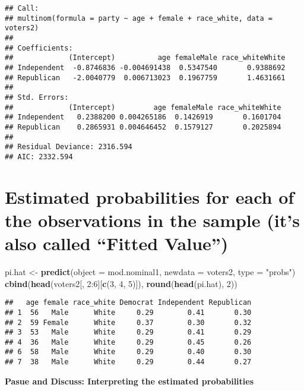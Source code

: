 \documentclass[]{article}
\newenvironment{Shaded}{\begin{snugshade}}{\end{snugshade}}
\newcommand{\KeywordTok}[1]{\textcolor[rgb]{0.13,0.29,0.53}{\textbf{{#1}}}}
\newcommand{\DataTypeTok}[1]{\textcolor[rgb]{0.13,0.29,0.53}{{#1}}}
\newcommand{\DecValTok}[1]{\textcolor[rgb]{0.00,0.00,0.81}{{#1}}}
\newcommand{\StringTok}[1]{\textcolor[rgb]{0.31,0.60,0.02}{{#1}}}
\newcommand{\NormalTok}[1]{{#1}}
\begin{document}
\begin{verbatim}
## Call:
## multinom(formula = party ~ age + female + race_white, data = voters2)
## 
## Coefficients:
##             (Intercept)          age femaleMale race_whiteWhite
## Independent  -0.8746836 -0.004691438  0.5347540       0.9388692
## Republican   -2.0040779  0.006713023  0.1967759       1.4631661
## 
## Std. Errors:
##             (Intercept)         age femaleMale race_whiteWhite
## Independent   0.2388200 0.004265186  0.1426919       0.1601704
## Republican    0.2865931 0.004646452  0.1579127       0.2025894
## 
## Residual Deviance: 2316.594 
## AIC: 2332.594
\end{verbatim}

\section{\texorpdfstring{Estimated probabilities for each of the
observations in the sample (it's also called ``Fitted
Value'')}{Estimated probabilities for each of the observations in the sample (it's also called Fitted Value)}}\label{estimated-probabilities-for-each-of-the-observations-in-the-sample-its-also-called-fitted-value}

\begin{Shaded}
\begin{Highlighting}[]
\NormalTok{pi.hat <-}\StringTok{ }\KeywordTok{predict}\NormalTok{(}\DataTypeTok{object =} \NormalTok{mod.nominal1, }\DataTypeTok{newdata =} \NormalTok{voters2, }\DataTypeTok{type =} \StringTok{"probs"}\NormalTok{)}
\KeywordTok{cbind}\NormalTok{(}\KeywordTok{head}\NormalTok{(voters2[, }\DecValTok{2}\NormalTok{:}\DecValTok{6}\NormalTok{][}\KeywordTok{c}\NormalTok{(}\DecValTok{3}\NormalTok{, }\DecValTok{4}\NormalTok{, }\DecValTok{5}\NormalTok{)]), }\KeywordTok{round}\NormalTok{(}\KeywordTok{head}\NormalTok{(pi.hat), }\DecValTok{2}\NormalTok{))}
\end{Highlighting}
\end{Shaded}

\begin{verbatim}
##   age female race_white Democrat Independent Republican
## 1  56   Male      White     0.29        0.41       0.30
## 2  59 Female      White     0.37        0.30       0.32
## 3  53   Male      White     0.29        0.41       0.29
## 4  36   Male      White     0.29        0.45       0.26
## 6  58   Male      White     0.29        0.40       0.30
## 7  38   Male      White     0.29        0.44       0.27
\end{verbatim}

\textbf{Pasue and Discuss: Interpreting the estimated probabilities}
\end{document}
